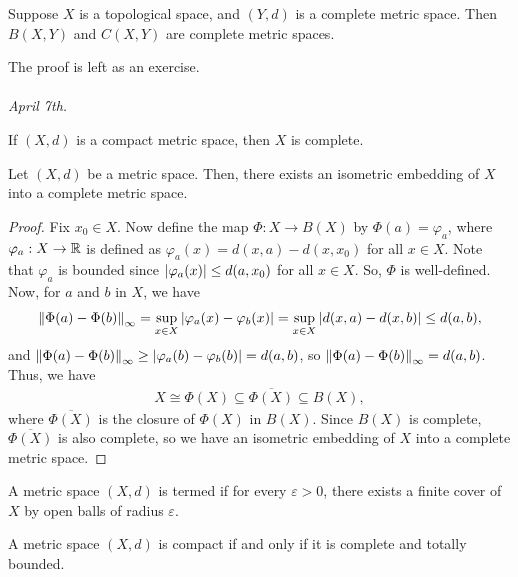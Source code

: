 \begin{proposition}
    Suppose $X$ is a topological space, and $(Y,d)$ is a complete metric space. Then $B(X,Y)$ and $C(X,Y)$ are complete metric spaces.
\end{proposition}

The proof is left as an exercise.
\\ \\
\noindent \textit{April 7th.}

\begin{theorem}
    If $(X,d)$ is a compact metric space, then $X$ is complete.
\end{theorem}

\begin{theorem}
    Let $(X,d)$ be a metric space. Then, there exists an isometric embedding of $X$ into a complete metric space.
\end{theorem}
\begin{proof}
    Fix $x_{0} \in X$. Now define the map $\Phi : X \to B(X)$ by $\Phi(a) = \varphi_{a}$, where $\varphi_{a} : X \to \mathbb{R}$ is defined as $\varphi_{a}(x) = d(x,a) - d(x,x_{0})$ for all $x \in X$. Note that $\varphi_{a}$ is bounded since $\left| \varphi_{a}(x) \right| \leq d(a,x_{0})$ for all $x \in X$. So, $\Phi$ is well-defined. Now, for $a$ and $b$ in $X$, we have
    \begin{align}
        \left\lVert\Phi(a)-\Phi(b)\right\rVert_{\infty} = \sup_{x \in X} \left| \varphi_{a}(x) - \varphi_{b}(x) \right| = \sup_{x \in X} \left| d(x,a) - d(x,b) \right| \leq d(a,b),
    \end{align}
    and $\left\lVert\Phi(a)-\Phi(b)\right\rVert_{\infty} \geq \left| \varphi_{a}(b) - \varphi_{b}(b) \right| = d(a,b)$, so $\left\lVert\Phi(a)-\Phi(b)\right\rVert_{\infty} = d(a,b)$. Thus, we have
    \begin{align}
        X \cong \Phi(X) \subseteq \overline{\Phi(X)} \subseteq B(X),
    \end{align}
    where $\overline{\Phi(X)}$ is the closure of $\Phi(X)$ in $B(X)$. Since $B(X)$ is complete, $\overline{\Phi(X)}$ is also complete, so we have an isometric embedding of $X$ into a complete metric space.
\end{proof}

\begin{definition}
    A metric space $(X,d)$ is termed  if for every $\varepsilon > 0$, there exists a finite cover of $X$ by open balls of radius $\varepsilon$.
\end{definition}

\begin{theorem}
    A metric space $(X,d)$ is compact if and only if it is complete and totally bounded.
\end{theorem}


